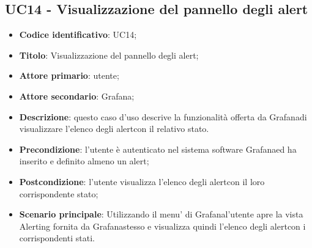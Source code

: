 \subsection{UC14 - Visualizzazione del pannello degli alert}
\begin{itemize}
	\item \textbf{Codice identificativo}: UC14;
	\item \textbf{Titolo}: Visualizzazione del pannello degli alert\glo;
	\item \textbf{Attore primario}: utente;
	\item \textbf{Attore secondario}: Grafana\glo;
	\item \textbf{Descrizione}: questo caso d'uso descrive la funzionalità offerta da Grafana\glosp di visualizzare l'elenco degli alert\glosp con il relativo stato.
	\item \textbf{Precondizione}: l'utente è autenticato nel sistema software Grafana\glosp ed ha inserito e definito almeno un alert\glo;
	\item \textbf{Postcondizione}: l'utente visualizza l'elenco degli alert\glosp con il loro corrispondente stato;
	\item \textbf{Scenario principale}: Utilizzando il menu' di Grafana\glosp l'utente apre la vista Alerting fornita da Grafana\glosp stesso e visualizza quindi l'elenco degli alert\glosp con i corrispondenti stati.
\end{itemize} 
